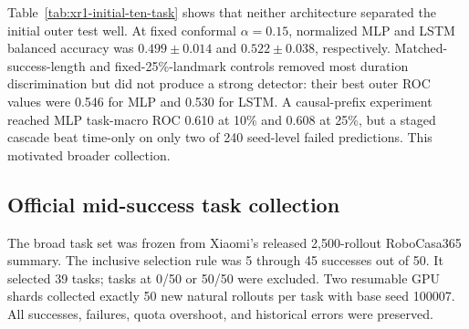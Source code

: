 \documentclass[11pt,a4paper]{article}
\begin{document}
Table~\ref{tab:xr1-initial-ten-task} shows that neither architecture separated
the initial outer test well. At fixed conformal $\alpha=0.15$, normalized MLP and LSTM balanced accuracy was
$0.499\pm0.014$ and $0.522\pm0.038$, respectively. Matched-success-length and
fixed-25\%-landmark controls removed most duration discrimination but did not
produce a strong detector: their best outer ROC values were 0.546 for MLP and
0.530 for LSTM. A causal-prefix experiment reached MLP task-macro ROC 0.610 at
10\% and 0.608 at 25\%, but a staged cascade beat time-only on only two of 240
seed-level failed predictions. This motivated broader collection.

\subsection{Official mid-success task collection}
The broad task set was frozen from Xiaomi's released 2,500-rollout
RoboCasa365 summary. The inclusive selection rule was 5 through 45 successes
out of 50. It selected 39 tasks; tasks at 0/50 or 50/50 were excluded. Two
resumable GPU shards collected exactly 50 new natural rollouts per task with
base seed 100007. All successes, failures, quota overshoot, and historical
errors were preserved.
\end{document}
